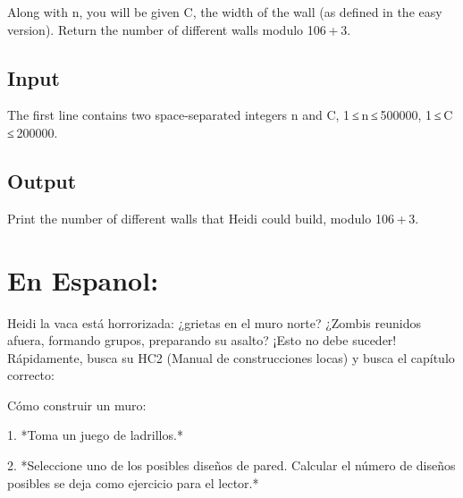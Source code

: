 \documentclass[12pt]{article}
\begin{document}
    \begin{flushleft}
        Along with n, you will be given C, the width of the wall (as defined in the easy version). Return the number of different walls modulo 106 + 3.
    \end{flushleft}


    \subsection*{Input}

    \begin{flushleft}
        The first line contains two space-separated integers n and C, 1 ≤ n ≤ 500000, 1 ≤ C ≤ 200000.
    \end{flushleft}


    \subsection*{Output}

    \begin{flushleft}
        Print the number of different walls that Heidi could build, modulo 106 + 3.
    \end{flushleft}

    \section*{En Espanol:}


    \begin{flushleft}
        Heidi la vaca está horrorizada: ¿grietas en el muro norte? ¿Zombis reunidos afuera, formando grupos, preparando su asalto? ¡Esto no debe suceder! Rápidamente, busca su HC2 (Manual de construcciones locas) y busca el capítulo correcto:
    \end{flushleft}

    \begin{flushleft}
        Cómo construir un muro:
    \end{flushleft}

    \begin{flushleft}
        1. *Toma un juego de ladrillos.*
    \end{flushleft}

    \begin{flushleft}
        2. *Seleccione uno de los posibles diseños de pared. Calcular el número de diseños posibles se deja como ejercicio para el lector.*
    \end{flushleft}
\end{document}
